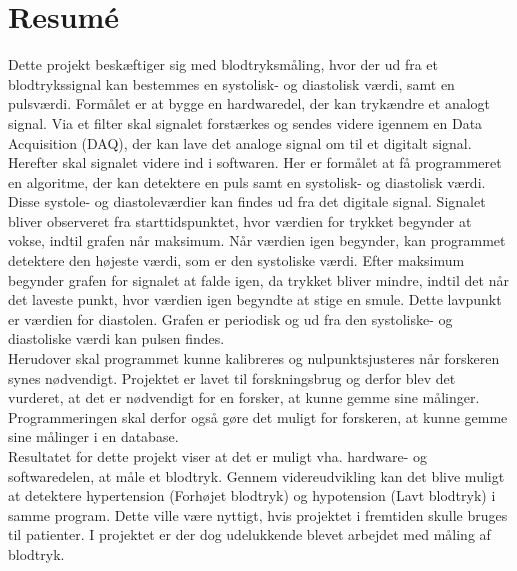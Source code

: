 \chapter{Resumé}
Dette projekt beskæftiger sig med blodtryksmåling, hvor der ud fra et blodtrykssignal kan bestemmes en systolisk- og diastolisk værdi, samt en pulsværdi. Formålet er at bygge en hardwaredel, der kan trykændre et analogt signal. Via et filter skal signalet forstærkes og sendes videre igennem en Data Acquisition (DAQ), der kan lave det analoge signal om til et digitalt signal. Herefter skal signalet videre ind i softwaren. Her er formålet at få programmeret en algoritme, der kan detektere en puls samt en systolisk- og diastolisk værdi. Disse systole- og diastoleværdier kan findes ud fra det digitale signal. Signalet bliver observeret fra starttidspunktet, hvor værdien for trykket begynder at vokse, indtil grafen når maksimum. Når værdien igen begynder, kan programmet detektere den højeste værdi, som er den systoliske værdi. Efter maksimum begynder grafen for signalet at falde igen, da trykket bliver mindre, indtil det når det laveste punkt, hvor værdien igen begyndte at stige en smule. 
Dette lavpunkt er værdien for diastolen. Grafen er periodisk og ud fra den systoliske- og diastoliske værdi kan pulsen findes. \\
Herudover skal programmet kunne kalibreres og nulpunktsjusteres når forskeren synes nødvendigt. Projektet er lavet til forskningsbrug og derfor blev det vurderet, at det er nødvendigt for en forsker, at kunne gemme sine målinger. Programmeringen skal derfor også gøre det muligt for forskeren, at kunne gemme sine målinger i en database.  \\
Resultatet for dette projekt viser at det er muligt vha. hardware- og softwaredelen, at måle et blodtryk. Gennem videreudvikling kan det blive muligt at detektere hypertension (Forhøjet blodtryk) og hypotension (Lavt blodtryk) i samme program. Dette ville være nyttigt, hvis projektet i fremtiden skulle bruges til patienter. I projektet er der dog udelukkende blevet arbejdet med måling af blodtryk.
